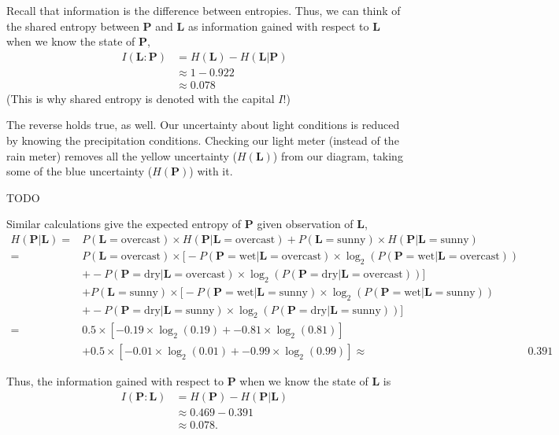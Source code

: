 Recall that information is the difference between entropies.
Thus, we can think of the shared entropy between $\bm{P}$ and $\bm{L}$ as information gained with respect to $\bm{L}$ when we know the state of $\bm{P}$,
\begin{align*}
I(\bm{L} : \bm{P})
&=
H(\bm{L}) - H(\bm{L} | \bm{P}) \\
&\approx
1 - 0.922 \\
&\approx
0.078
\end{align*}
(This is why shared entropy is denoted with the capital $I$!)

The reverse holds true, as well.
Our uncertainty about light conditions is reduced by knowing the precipitation conditions.
Checking our light meter (instead of the rain meter) removes all the yellow uncertainty ($H(\bm{L})$) from our diagram, taking some of the blue uncertainty ($H(\bm{P})$) with it.
\begin{center}
TODO
\end{center}
Similar calculations give the expected entropy of $\bm{P}$ given observation of $\bm{L}$,
\begin{align*}
H(\bm{P} | \bm{L})
=&
P(\bm{L} = \text{overcast}) \times H(\bm{P} | \bm{L} = \text{overcast})
+ P(\bm{L} = \text{sunny}) \times H(\bm{P} | \bm{L} = \text{sunny}) \\
=&
P(\bm{L} = \text{overcast}) \times \Big[ - P(\bm{P} = \text{wet} | \bm{L} = \text{overcast}) \times \log_2(P(\bm{P} = \text{wet} | \bm{L} = \text{overcast})) \\
&+ - P(\bm{P} = \text{dry} | \bm{L} = \text{overcast}) \times \log_2(P(\bm{P} = \text{dry} | \bm{L} = \text{overcast})) \Big] \\
&+ P(\bm{L} = \text{sunny})\times \Big[ - P(\bm{P} = \text{wet} | \bm{L} = \text{sunny}) \times \log_2(P(\bm{P} = \text{wet} | \bm{L} = \text{sunny})) \\
&+ - P(\bm{P} = \text{dry} | \bm{L} = \text{sunny}) \times \log_2(P(\bm{P} = \text{dry} | \bm{L} = \text{sunny})) \Big] \\
=&
0.5 \times [ - 0.19 \times \log_2(0.19) + - 0.81 \times \log_2(0.81) ] \\
&+ 0.5 \times [ - 0.01 \times \log_2(0.01) + - 0.99 \times \log_2(0.99) ]
\approx&
0.391
\end{align*}

Thus, the information gained with respect to $\bm{P}$ when we know the state of $\bm{L}$ is
\begin{align*}
I(\bm{P} : \bm{L})
&=
H(\bm{P}) - H(\bm{P} | \bm{L}) \\
&\approx
0.469 - 0.391 \\
&\approx
0.078.
\end{align*}

